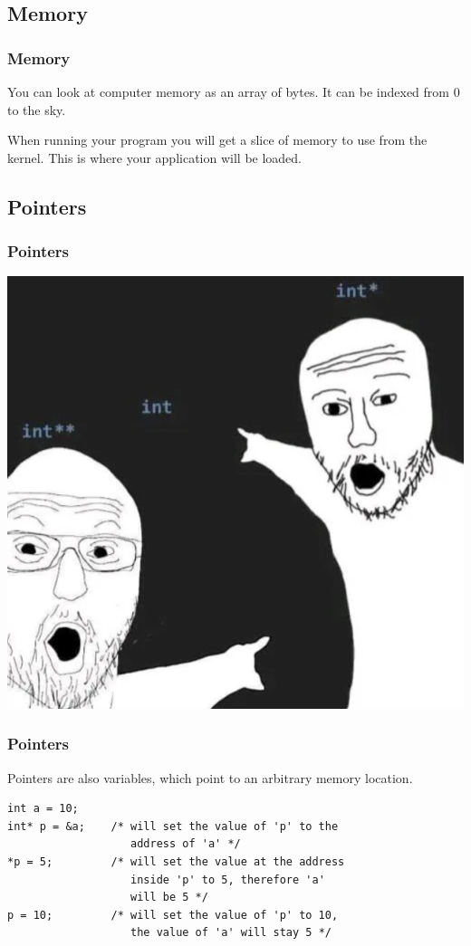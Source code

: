 \documentclass[
	11pt, %
]{beamer}
\begin{document}
\begin{frame}
    \subsection{Memory}
	\frametitle{Memory}

    You can look at computer memory as an array of bytes. It can be indexed from 0 to the sky.

    \bigskip

    When running your program you will get a slice of memory to use from the kernel.
    This is where your application will be loaded.

\end{frame}

\begin{frame}[fragile]
    \subsection{Pointers}
	\frametitle{Pointers}

    \centering
    \includegraphics[width=.6\textwidth]{images/pointer-meme.png}

\end{frame}

\begin{frame}[fragile]
	\frametitle{Pointers}

    Pointers are also variables, which point to an arbitrary memory location.

    \bigskip

    \begin{lstlisting}[style=CStyle]
int a = 10;
int* p = &a;    /* will set the value of 'p' to the
                   address of 'a' */
*p = 5;         /* will set the value at the address
                   inside 'p' to 5, therefore 'a'
                   will be 5 */
p = 10;         /* will set the value of 'p' to 10,
                   the value of 'a' will stay 5 */

\end{lstlisting}
\end{frame}
\end{document}
